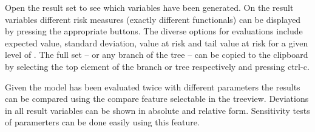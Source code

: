 Open the result set to see which variables have been generated. On the result
variables different risk measures (exactly different functionals) can be displayed
by pressing the appropriate buttons. The diverse options for evaluations include
expected value, standard deviation, value at risk and tail value at risk for a given
level of . The full set -- or any branch of the tree -- can be copied to the clipboard by selecting the top element of the branch or tree respectively and pressing ctrl-c.


Given the model has been evaluated twice with different parameters the results can be
compared using the compare feature selectable in the treeview. Deviations in all result
variables can be shown in absolute and relative form. Sensitivity tests of paramerters
can be done easily using this feature.

